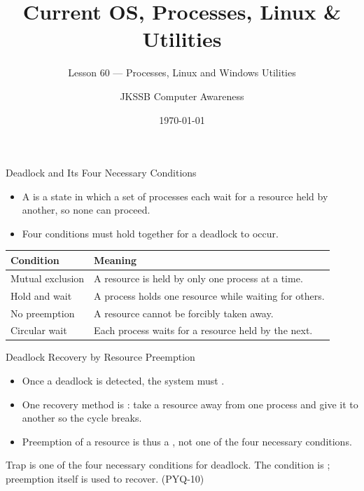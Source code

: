 \documentclass[aspectratio=169]{beamer}
\title{Current OS, Processes, Linux \& Utilities}
\subtitle{Lesson 60 --- Processes, Linux and Windows Utilities}
\author{JKSSB Computer Awareness}
\date{\today}
\begin{document}
\frame{\titlepage}

\begin{frame}{Deadlock and Its Four Necessary Conditions}
  \begin{itemize}
    \item A  is a state in which a set of processes each wait
      for a resource held by another, so none can proceed.
    \item Four conditions must hold together for a deadlock to occur.
  \end{itemize}
  \begin{center}
    \begin{tabular}{p{}p{}}
      \toprule
      \textbf{Condition} & \textbf{Meaning} \\
      \midrule
      Mutual exclusion & A resource is held by only one process at a time. \\
      Hold and wait & A process holds one resource while waiting for others. \\
      No preemption & A resource cannot be forcibly taken away. \\
      Circular wait & Each process waits for a resource held by the next. \\
      \bottomrule
    \end{tabular}
  \end{center}
\end{frame}

\begin{frame}{Deadlock Recovery by Resource Preemption}
  \begin{itemize}
    \item Once a deadlock is detected, the system must .
    \item One recovery method is : take a resource
      away from one process and give it to another so the cycle breaks.
    \item Preemption of a resource is thus a , not
      one of the four necessary conditions.
  \end{itemize}
  \begin{alertblock}{Trap}
     is  one of the four necessary conditions for
    deadlock. The condition is ; preemption itself is used
    to recover. (PYQ-10)
  \end{alertblock}
\end{frame}
\end{document}
